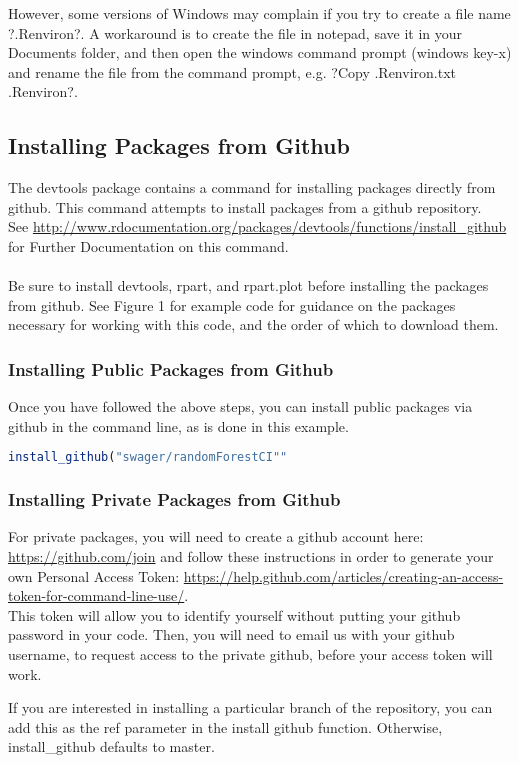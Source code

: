 \documentclass{article}
\begin{document}
However, some versions of Windows may complain if you try to create a file name ?.Renviron?.  A workaround is to create the file in notepad, save it in your Documents folder, and then open the windows command prompt (windows key-x) and rename the file from the command prompt, e.g. ?Copy .Renviron.txt .Renviron?.


\subsection{Installing Packages from Github}
The devtools package contains a command for installing packages directly from github. This command attempts to install packages from a github repository. \\ 
See \url{http://www.rdocumentation.org/packages/devtools/functions/install_github} for Further Documentation on this command. \\ \\
Be sure to install devtools, rpart, and rpart.plot before installing the packages from github. See Figure 1 for example code for guidance on the packages necessary for working with this code, and the order of which to download them. 
\subsubsection{Installing Public Packages from Github}
Once you have followed the above steps, you can install public packages via github in the command line, as is done in this example.
\begin{lstlisting}[language=R]
install_github("swager/randomForestCI""
\end{lstlisting}


\subsubsection{Installing Private Packages from Github}
For private packages, you will need to create a github account here: \url{https://github.com/join}
and follow these instructions in order to generate your own Personal Access Token: \url{https://help.github.com/articles/creating-an-access-token-for-command-line-use/}. \\ This token will allow you to identify yourself without putting your github password in your code. Then, you will need to email us with your github username, to request access to the private github, before your access token will work. 

If you are interested in installing a particular branch of the repository, you can add this as the ref parameter in the install github function. Otherwise, install\_github defaults to master. 
\end{document}

